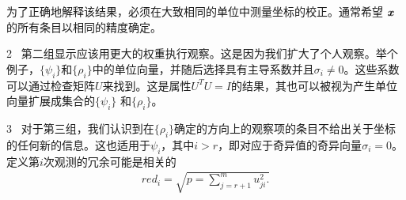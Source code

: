 为了正确地解释该结果，必须在大致相同的单位中测量坐标的校正。通常希望 $\textbf{\textit{x}}$的所有条目以相同的精度确定。

2 \ 第二组显示应该用更大的权重执行观察。这是因为我们扩大了个人观察。举个例子，$ \{\psi_{i}\} $和$ \{\rho_{i}\} $中的单位向量，并随后选择具有主导系数并且$ \sigma_{i}\neq0 $。这些系数可以通过检查矩阵$U$来找到。这是属性$U^{T}U=I$的结果，其也可以被视为产生单位向量扩展成集合的$ \{\psi_{i}\} $ 和$ \{\rho_{i}\} $。

3 \ 对于第三组，我们认识到在$ \{\rho_{i}\} $确定的方向上的观察项的条目不给出关于坐标的任何新的信息。这也适用于$ \psi_{i} $，其中$i>r$，即对应于奇异值的奇异向量$ \sigma_{i}=0 $。定义第$i$次观测的冗余可能是相关的
\begin{align}
red_{i}=\sqrt{p = \sum_{j=r+1}^mu^{2}_{ji}.}
\end{align}
 
